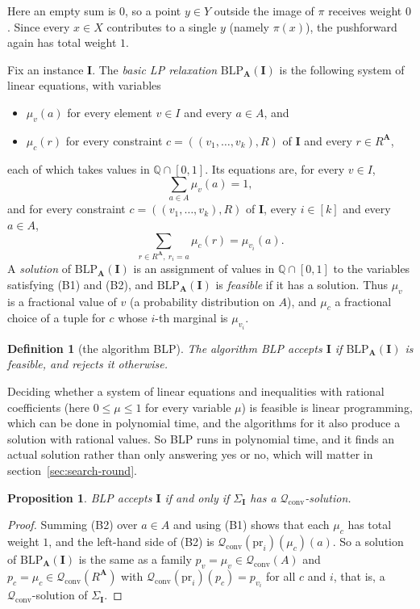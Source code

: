 \documentclass[11pt]{article}
\theoremstyle{plain}
\newtheorem{proposition}[theorem]{Proposition}
\newtheorem{definition}[theorem]{Definition}
\theoremstyle{definition}
\newcommand{\pr}{\mathrm{pr}}
\newcommand{\bA}{\mathbf{A}}
\newcommand{\bI}{\mathbf{I}}
\newcommand{\Q}{\mathbb{Q}}
\newcommand{\Qc}{\mathscr{Q}_{\mathrm{conv}}}
\newcommand{\BLP}{\mathrm{BLP}}
\begin{document}
Here an empty sum is $0$, so a point $y\in Y$ outside the image of $\pi$ receives weight $0$. Since every $x\in X$ contributes to a single $y$ (namely $\pi(x)$), the pushforward again has total weight $1$.

Fix an instance $\bI$. The \emph{basic LP relaxation} $\BLP_{\bA}(\bI)$ is the following system of linear equations, with variables
\begin{itemize}
  \item $\mu_v(a)$ for every element $v\in I$ and every $a\in A$, and
  \item $\mu_c(r)$ for every constraint $c=((v_1,\dots,v_k),R)$ of $\bI$ and every $r\in R^{\bA}$,
\end{itemize}
each of which takes values in $\Q\cap[0,1]$. Its equations are, for every $v\in I$,
\[
\sum_{a\in A}\mu_v(a)=1,\tag{B1}
\]
and for every constraint $c=((v_1,\dots,v_k),R)$ of $\bI$, every $i\in[k]$ and every $a\in A$,
\[
\sum_{r\in R^{\bA},\ r_i=a}\mu_c(r)=\mu_{v_i}(a).\tag{B2}
\]
A \emph{solution} of $\BLP_{\bA}(\bI)$ is an assignment of values in $\Q\cap[0,1]$ to the variables satisfying (B1) and (B2), and $\BLP_{\bA}(\bI)$ is \emph{feasible} if it has a solution. Thus $\mu_v$ is a fractional value of $v$ (a probability distribution on $A$), and $\mu_c$ a fractional choice of a tuple for $c$ whose $i$-th marginal is $\mu_{v_i}$.

\begin{definition}[the algorithm BLP]
The algorithm \emph{BLP} accepts $\bI$ if $\BLP_{\bA}(\bI)$ is feasible, and rejects it otherwise.
\end{definition}

Deciding whether a system of linear equations and inequalities with rational coefficients (here $0\leq\mu\leq1$ for every variable $\mu$) is feasible is linear programming, which can be done in polynomial time, and the algorithms for it also produce a solution with rational values. So BLP runs in polynomial time, and it finds an actual solution rather than only answering yes or no, which will matter in section~\ref{sec:search-round}.

\begin{proposition}\label{prop:blp}
BLP accepts $\bI$ if and only if $\Sigma_{\bI}$ has a $\Qc$-solution.
\end{proposition}

\begin{proof}
Summing (B2) over $a\in A$ and using (B1) shows that each $\mu_c$ has total weight $1$, and the left-hand side of (B2) is $\Qc(\pr_i)(\mu_c)(a)$. So a solution of $\BLP_{\bA}(\bI)$ is the same as a family $p_v=\mu_v\in\Qc(A)$ and $p_c=\mu_c\in\Qc(R^{\bA})$ with $\Qc(\pr_i)(p_c)=p_{v_i}$ for all $c$ and $i$, that is, a $\Qc$-solution of $\Sigma_{\bI}$.
\end{proof}
\end{document}
